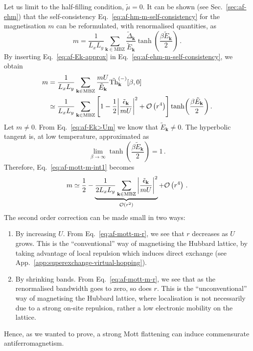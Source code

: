Let us limit to the half-filling condition, $\tilde{\mu}=0$. It can be shown (see Sec.~\ref{sec:af-ehm}) that the self-consistency Eq.~\eqref{eq:af-hm-m-self-consistency} for the magnetisation $m$ can be reformulated, with renormalised quantities, as
\begin{equation}\label{eq:af-ehm-m-self-consistency}
	m = \frac{1}{L_x L_y} \sum_{\mathbf{k} \in \mathrm{MBZ}} \frac{\tilde{\Delta}_\mathbf{k}}{\tilde{E}_{\mathbf{k}}} \tanh(\frac{\beta \tilde{E}_\mathbf{k}}{2}) \, .
\end{equation}
By inserting Eq.~\eqref{eq:af-Ek-approx} in Eq.~\eqref{eq:af-ehm-m-self-consistency}, we obtain
\begin{align}
	m &= \frac{1}{L_x L_y} \sum_{\mathbf{k} \in \mathrm{MBZ}} \frac{mU}{\tilde{E}_\mathbf{k}} \tilde{\mathrm{Th}}_\mathbf{k}^{(-)}[\beta,0] \nonumber \\
	&\simeq \frac{1}{L_x L_y} \sum_{\mathbf{k} \in \mathrm{MBZ}} \left[
	1 - \frac{1}{2} \abs{\frac{\tilde{\epsilon}_\mathbf{k}}{mU}}^2 + \mathcal{O} \left(r^4\right)
	\right] \tanh(\frac{\beta \tilde{E}_\mathbf{k}}{2}) \label{eq:af-mott-m-int1} \, .
\end{align}
Let $m \neq 0$. From Eq.~\eqref{eq:af-Ek>Um} we know that $\tilde{E}_\mathbf{k} \neq 0$. The hyperbolic tangent is, at low temperature, approximated as
\[
\lim_{\beta \to \infty} \tanh(\frac{\beta \tilde{E}_\mathbf{k}}{2}) = 1 \, .
\]
Therefore, Eq.~\eqref{eq:af-mott-m-int1} becomes
\begin{align}
	m \simeq \frac{1}{2} -
	\underbrace{
		\frac{1}{2L_x L_y} \sum_{\mathbf{k} \in \mathrm{MBZ}} \abs{\frac{\tilde{\epsilon}_\mathbf{k}}{mU}}^2 
	}_{\mathcal{O} \left(r^2\right)}
	+ \mathcal{O} \left(r^4\right) \, .
\end{align}
The second order correction can be made small in two ways:
\begin{enumerate}
	\item By increasing $U$. From Eq.~\eqref{eq:af-mott-m-r}, we see that $r$ decreases as $U$ grows. This is the ``conventional'' way of magnetising the Hubbard lattice, by taking advantage of local repulsion which induces direct exchange (see App.~\ref{app:superexchange-virtual-hopping}).
	\item By shrinking bands. From Eq.~\eqref{eq:af-mott-m-r}, we see that as the renormalised bandwidth goes to zero, so does $r$. This is the ``unconventional'' way of magnetising the Hubbard lattice, where localisation is not necessarily due to a strong on-site repulsion, rather a low electronic mobility on the lattice.
\end{enumerate}
Hence, as we wanted to prove, a strong Mott flattening can induce commensurate antiferromagnetism.

